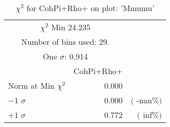  \begin{table}[h!]\centering
 {\small{
 \begin{tabular}{||l||r||r||}
 \hline
 \hline
\multicolumn{2}{||c||}{$\chi^{2}$ Min  24.235} & \\
 \multicolumn{2}{||c||}{Number of bins used:   29.} & \\
\multicolumn{2}{||c||}{One $\sigma$:    0.914} & \\
 \hline
 \hline
    & CohPi+Rho+ & \\
Norm at Min $\chi^{2}$  &   0.000 & \\
$-1$ $\sigma$ &   0.000  &  $($ -nan$\%)$  \\
$+1$ $\sigma$ &   0.772  &  $($  inf$\%)$  \\
 \hline
 \hline
 \end{tabular}
 \caption{$\chi^{2}$ for CohPi+Rho+ on plot: 'Mmumu'}
 \label{tab-chicohpip}
 }}
 \end{table}
 \endinput
